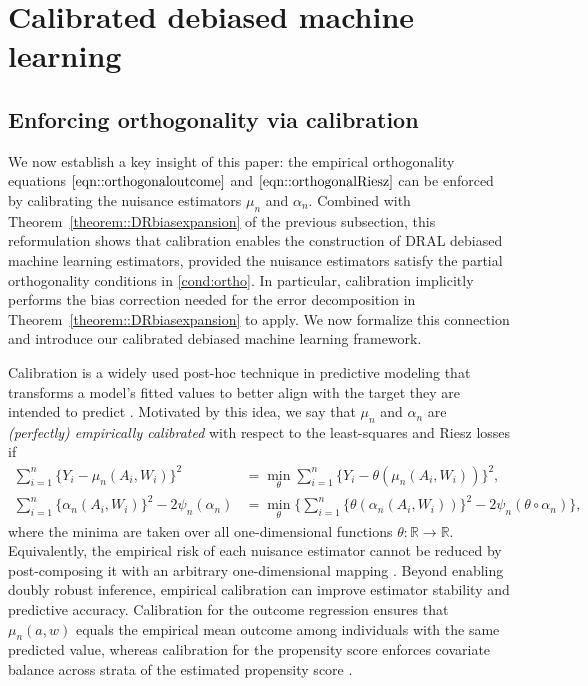 \documentclass[11pt]{article}
\theoremstyle{plain}
\begin{document}
\section{Calibrated debiased machine learning}
\label{section::proposedestimator}

\subsection{Enforcing orthogonality via calibration}
\label{section::calibration}


We now establish a key insight of this paper: the
empirical orthogonality equations \(\eqref{eqn::orthogonaloutcome}\) and
\(\eqref{eqn::orthogonalRiesz}\) can be enforced by calibrating the nuisance
estimators \(\mu_n\) and \(\alpha_n\).  Combined with Theorem~\ref{theorem::DRbiasexpansion} of the previous subsection, this
reformulation shows that calibration enables the construction of DRAL debiased
machine learning estimators, provided the nuisance estimators satisfy the
partial orthogonality conditions in \ref{cond:ortho}. In particular,
calibration implicitly performs the bias correction needed for the error
decomposition in Theorem~\ref{theorem::DRbiasexpansion} to apply. We now
formalize this connection and introduce our calibrated debiased machine
learning framework.





Calibration is a widely used post-hoc technique in predictive modeling that
transforms a model's fitted values to better align with the target they are
intended to predict \citep{lichtenstein1977calibration, zadrozny2002transforming,
niculescu2005predicting, bella2010calibration, guo2017calibration,
gupta2020distribution}. Motivated by this idea, we say that \(\mu_n\) and \(\alpha_n\) are
\emph{(perfectly) empirically calibrated} with respect to the least-squares and
Riesz losses if
\begin{align}
\sum_{i=1}^n \{Y_i - \mu_n(A_i, W_i)\}^2
&= \min_{\theta}\sum_{i=1}^n \{Y_i - \theta(\mu_n(A_i, W_i))\}^2,
\label{eqn::calpropertyoutcome} \\
\sum_{i=1}^n \{\alpha_n(A_i, W_i)\}^2 - 2 \psi_n(\alpha_n)
&= \min_{\theta}\Bigg\{
    \sum_{i=1}^n \{\theta(\alpha_n(A_i, W_i))\}^2
    - 2 \psi_n(\theta \circ \alpha_n)
  \Bigg\},
\label{eqn::calpropertyRiesz}
\end{align}
where the minima are taken over all one-dimensional functions
\(\theta:\mathbb{R}\to\mathbb{R}\). Equivalently, the empirical risk of each nuisance estimator cannot be reduced by
post-composing it with an arbitrary one-dimensional mapping
\citep{whitehouse2024orthogonal}.  Beyond enabling doubly robust inference, empirical calibration can improve
estimator stability and predictive accuracy. Calibration for the outcome regression ensures that $\mu_n(a,w)$ equals the empirical mean outcome
among individuals with the same predicted value, whereas calibration for the propensity
score enforces covariate balance across strata of the estimated propensity score
\citep{deshpande2023calibrated,van_der_Laan2024stabilized}.
\end{document}
